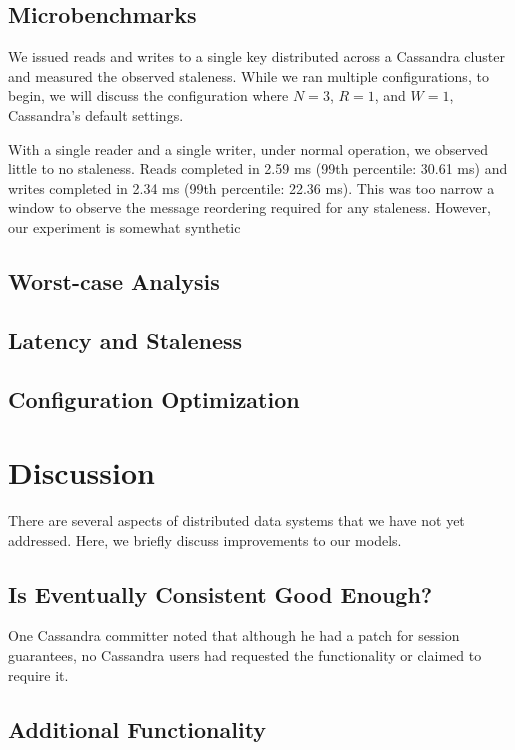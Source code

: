 \documentclass{vldb}
\begin{document}
\subsection{Microbenchmarks}

We issued reads and writes to a single key distributed across a
Cassandra cluster and measured the observed staleness.  While we ran
multiple configurations, to begin, we will discuss the configuration
where $N=3$, $R=1$, and $W=1$, Cassandra's default settings.

With a single reader and a single writer, under normal operation, we
observed little to no staleness.  Reads completed in 2.59 ms (99th
percentile: 30.61 ms) and writes completed in 2.34 ms (99th
percentile: 22.36 ms).  This was too narrow a window to observe the
message reordering required for any staleness.  However, our experiment is somewhat synthetic



\subsection{Worst-case Analysis}

\subsection{Latency and Staleness}

\subsection{Configuration Optimization}

\section{Discussion}
\label{sec:discussion}

There are several aspects of distributed data systems that we have not yet
addressed.  Here, we briefly discuss improvements to our models.

\subsection{Is Eventually Consistent Good Enough?}

One Cassandra committer noted that although he had a patch for session guarantees, no Cassandra users had requested the functionality or claimed to require it.

\subsection{Additional Functionality}
\end{document}
